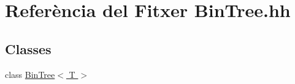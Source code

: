 \hypertarget{_bin_tree_8hh}{}\section{Referència del Fitxer Bin\+Tree.\+hh}
\label{_bin_tree_8hh}
\subsection*{Classes}
\begin{DoxyCompactItemize}
\item 
class \hyperlink{class_bin_tree}{Bin\+Tree$<$ T $>$}
\end{DoxyCompactItemize}
